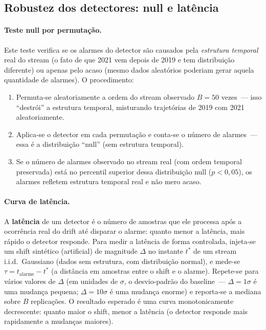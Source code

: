 \documentclass[11pt,a4paper]{article}
\begin{document}
\subsection{Robustez dos detectores: null e lat\^encia}

\paragraph{Teste null por permuta\c{c}\~ao.}
Este teste verifica se os alarmes do detector s\~ao causados pela \emph{estrutura temporal} real do stream (o fato de que 2021 vem depois de 2019 e tem distribui\c{c}\~ao diferente) ou apenas pelo acaso (mesmo dados aleat\'orios poderiam gerar aquela quantidade de alarmes). O procedimento:
\begin{enumerate}[leftmargin=1.4em,itemsep=1pt]
    \item Permuta-se aleatoriamente a ordem do stream observado $B\!=\!50$ vezes~--- isso ``destr\'oi'' a estrutura temporal, misturando trajet\'orias de 2019 com 2021 aleatoriamente.
    \item Aplica-se o detector em cada permuta\c{c}\~ao e conta-se o n\'umero de alarmes~--- essa \'e a distribui\c{c}\~ao ``null'' (sem estrutura temporal).
    \item Se o n\'umero de alarmes observado no stream real (com ordem temporal preservada) est\'a no percentil superior dessa distribui\c{c}\~ao null ($p\!<\!0{,}05$), os alarmes refletem estrutura temporal real e n\~ao mero acaso.
\end{enumerate}

\paragraph{Curva de lat\^encia.}
A \textbf{lat\^encia} de um detector \'e o n\'umero de amostras que ele processa ap\'os a ocorr\^encia real do drift at\'e disparar o alarme: quanto menor a lat\^encia, mais r\'apido o detector responde. Para medir a lat\^encia de forma controlada, injeta-se um shift sint\'etico (artificial) de magnitude $\Delta$ no instante $t^*$ de um stream i.i.d.\ Gaussiano (dados sem estrutura, com distribui\c{c}\~ao normal), e mede-se $\tau\!=\!t_\text{alarme}\!-\!t^*$ (a dist\^ancia em amostras entre o shift e o alarme). Repete-se para v\'arios valores de $\Delta$ (em unidades de $\sigma$, o desvio-padr\~ao do baseline~--- $\Delta = 1\sigma$ \'e uma mudan\c{c}a pequena; $\Delta = 10\sigma$ \'e uma mudan\c{c}a enorme) e reporta-se a mediana sobre $B$ replic\-a\-\c{c}\~oes. O resultado esperado \'e uma curva monotonicamente decrescente: quanto maior o shift, menor a lat\^encia (o detector responde mais rapidamente a mudan\c{c}as maiores).
\end{document}
